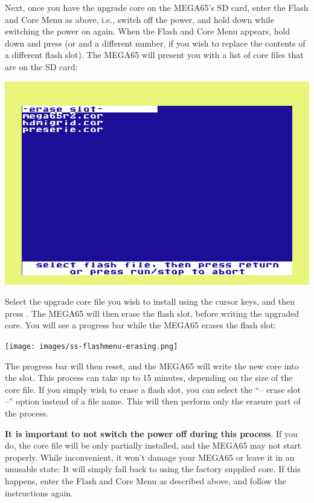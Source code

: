 Next, once you have the upgrade core on the MEGA65's SD card, enter the Flash and Core Menu as above,
i.e., switch off the power, and hold  down while switching the power on again.  When the Flash
and Core Menu appears, hold  down and press
 (or  and a different number, if you wish to replace the
contents of a different flash slot). The MEGA65
will present you with a list of core files that are on the SD card:

\begin{center}
\includegraphics[trim= 10mm  5mm 10mm 15mm,clip,width=0.7\linewidth]{images/ss-flashmenu-selectcore.png}
\end{center}

Select the upgrade core file you wish to
install using the cursor keys, and then press .  The MEGA65 will then erase
the flash slot, before writing the upgraded core.  You will see a progress bar while the MEGA65 erases
the flash slot:

\begin{center}
\texttt{[image: images/ss-flashmenu-erasing.png]}
\end{center}

The progress bar will then reset, and the MEGA65 will
write the new core into the slot. This process can take up to 15
minutes, depending on the size of the core file.  If you simply wish
to erase a flash slot, you can select the
``-- erase slot --'' option instead of a file name. This will then perform
only the erasure part of the process.

{\bf It is important to not switch the power off during this process}. If you do, the core file will be
only partially installed, and the MEGA65 may not start properly.
While
inconvenient, it won't damage your MEGA65 or leave it
in an unusable state: It will simply fall back to using the factory
supplied core.
If this happens, enter the Flash and Core Menu
as described above, and follow the instructions again.

